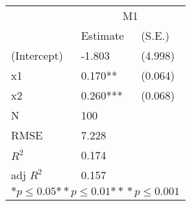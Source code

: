 \begin{tabular}{*{3}{l}}
\hline
                  & \multicolumn{2}{c}{M1}   \tabularnewline
                   &Estimate  &(S.E.)  \tabularnewline
 \hline
 \hline
   (Intercept)     &-1.803   &   (4.998) \tabularnewline
   x1              &0.170**   &   (0.064) \tabularnewline
   x2              &0.260***   &   (0.068) \tabularnewline
 \hline
 N                 &100       &        \tabularnewline
 RMSE             &7.228         & \tabularnewline
 $R^2$             &0.174         & \tabularnewline
 adj $R^2$         &0.157         & \tabularnewline
 \hline
\hline
 
 \multicolumn{3}{c}{${*  p}\le 0.05$${*\!\!*  p}\le 0.01$${*\!\!*\!\!*  p}\le 0.001$}\tabularnewline
 \end{tabular}